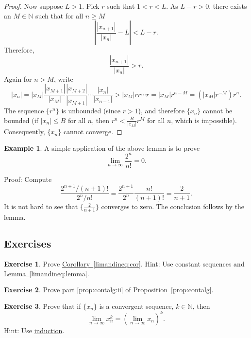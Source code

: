 \documentclass[12pt]{book}
\newcommand{\abs}[1]{\left\lvert {#1} \right\rvert}
\newcommand{\N}{{\mathbb{N}}}
\theoremstyle{plain}
\theoremstyle{remark}
\theoremstyle{definition}
\theoremstyle{exercise}
\newtheorem{exercise}{Exercise}[section]
\theoremstyle{example}
\newtheorem{example}[thm]{Example}
\newcommand{\propref}[1]{\hyperref[#1]{Proposition~\ref*{#1}}}
\newcommand{\lemmaref}[1]{\hyperref[#1]{Lemma~\ref*{#1}}}
\newcommand{\corref}[1]{\hyperref[#1]{Corollary~\ref*{#1}}}
\begin{document}
\begin{proof}
Now suppose $L > 1$.  Pick
$r$ such that $1 < r < L$.  As $L-r > 0$,
there exists an $M \in \N$ such that for
all $n \geq M$
\begin{equation*}
\abs{\frac{\abs{x_{n+1}}}{\abs{x_n}} - L} < L-r .
\end{equation*}
Therefore,
\begin{equation*}
\frac{\abs{x_{n+1}}}{\abs{x_n}} > r .
\end{equation*}
Again for $n > M$,
write
\begin{equation*}
\abs{x_n} =
\abs{x_M}
\frac{\abs{x_{M+1}}}{\abs{x_{M}}}
\frac{\abs{x_{M+2}}}{\abs{x_{M+1}}}
\cdots
\frac{\abs{x_{n}}}{\abs{x_{n-1}}}
>
\abs{x_M}
r r \cdots r = \abs{x_M} r^{n-M} = (\abs{x_M} r^{-M}) r^n .
\end{equation*}
The sequence $\{ r^n \}$ is unbounded (since $r > 1$), and therefore
$\{x_n\}$ cannot be bounded (if $\abs{x_n} \leq B$ for all $n$, then
$r^n < \frac{B}{\abs{x_M}} r^{M}$ for all $n$, which is impossible).
Consequently, $\{ x_n \}$ cannot converge.
\end{proof}

\begin{example}
A simple application of the above lemma is to prove 
\begin{equation*}
\lim_{n\to\infty} \frac{2^n}{n!} = 0 .
\end{equation*}

Proof:
Compute
\begin{equation*}
\frac{2^{n+1} / (n+1)!}{2^n/n!}
=
\frac{2^{n+1}}{2^n}\frac{n!}{(n+1)!}
=
\frac{2}{n+1} .
\end{equation*}
It is not hard to see that $\{ \frac{2}{n+1} \}$ converges to zero.
The conclusion follows by the lemma.
\end{example}

\subsection{Exercises}

\begin{exercise}
Prove \corref{limandineq:cor}.  Hint: Use constant sequences
and \lemmaref{limandineq:lemma}.
\end{exercise}

\begin{exercise}
Prove part \ref{prop:contalg:ii} of \propref{prop:contalg}.
\end{exercise}

\begin{exercise}
Prove that if $\{ x_n \}$ is a convergent sequence, $k \in \N$, then
\begin{equation*}
\lim_{n\to\infty} x_n^k = 
{\left( \lim_{n\to\infty} x_n \right)}^k .
\end{equation*}
Hint: Use \hyperref[induction:thm]{induction}.
\end{exercise}
\end{document}
